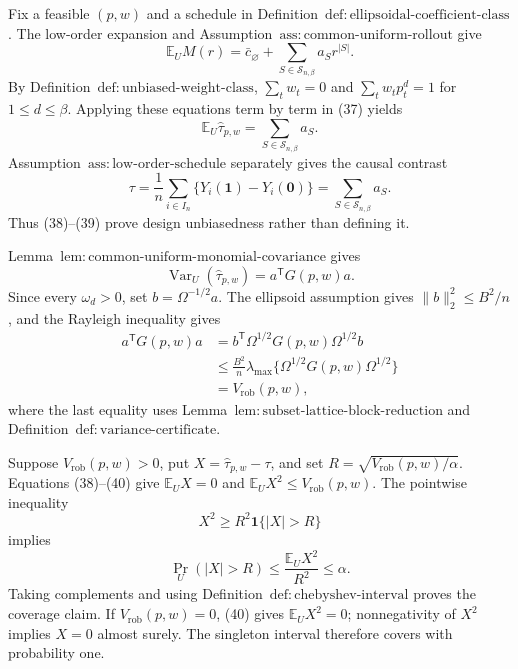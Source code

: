Fix a feasible \((p,w)\) and a schedule in Definition~\(\mathrm{def{:}ellipsoidal\text{-}coefficient\text{-}class}\).  The low-order expansion and Assumption~\(\mathrm{ass{:}common\text{-}uniform\text{-}rollout}\) give
\[
\mathbb E_U M(r)=\bar c_{\varnothing}
+\sum_{S\in\mathcal S_{n,\beta}}a_Sr^{|S|}.
\tag{37}
\]
By Definition~\(\mathrm{def{:}unbiased\text{-}weight\text{-}class}\), \(\sum_tw_t=0\) and \(\sum_tw_tp_t^d=1\) for \(1\le d\le\beta\).  Applying these equations term by term in (37) yields
\[
\mathbb E_U\widehat\tau_{p,w}=\sum_{S\in\mathcal S_{n,\beta}}a_S.
\tag{38}
\]
Assumption~\(\mathrm{ass{:}low\text{-}order\text{-}schedule}\) separately gives the causal contrast
\[
\tau=\frac1n\sum_{i\in I_n}\{Y_i(\mathbf1)-Y_i(\mathbf0)\}
=\sum_{S\in\mathcal S_{n,\beta}}a_S.
\tag{39}
\]
Thus (38)--(39) prove design unbiasedness rather than defining it.

Lemma~\(\mathrm{lem{:}common\text{-}uniform\text{-}monomial\text{-}covariance}\) gives
\[
\operatorname{Var}_U(\widehat\tau_{p,w})=a^{\mathsf T}G(p,w)a.
\]
Since every \(\omega_d>0\), set \(b=\Omega^{-1/2}a\).  The ellipsoid assumption gives \(\|b\|_2^2\le B^2/n\), and the Rayleigh inequality gives
\[
\begin{aligned}
a^{\mathsf T}G(p,w)a
&=b^{\mathsf T}\Omega^{1/2}G(p,w)\Omega^{1/2}b\\
&\le\frac{B^2}{n}\lambda_{\max}\{\Omega^{1/2}G(p,w)\Omega^{1/2}\}\\
&=V_{\mathrm{rob}}(p,w),
\end{aligned}
\tag{40}
\]
where the last equality uses Lemma~\(\mathrm{lem{:}subset\text{-}lattice\text{-}block\text{-}reduction}\) and Definition~\(\mathrm{def{:}variance\text{-}certificate}\).

Suppose \(V_{\mathrm{rob}}(p,w)>0\), put \(X=\widehat\tau_{p,w}-\tau\), and set \(R=\sqrt{V_{\mathrm{rob}}(p,w)/\alpha}\).  Equations (38)--(40) give \(\mathbb E_UX=0\) and \(\mathbb E_UX^2\le V_{\mathrm{rob}}(p,w)\).  The pointwise inequality
\[
X^2\ge R^2\mathbf1\{|X|>R\}
\]
implies
\[
\Pr_U(|X|>R)\le\frac{\mathbb E_UX^2}{R^2}\le\alpha.
\]
Taking complements and using Definition~\(\mathrm{def{:}chebyshev\text{-}interval}\) proves the coverage claim.  If \(V_{\mathrm{rob}}(p,w)=0\), (40) gives \(\mathbb E_UX^2=0\); nonnegativity of \(X^2\) implies \(X=0\) almost surely.  The singleton interval therefore covers with probability one.